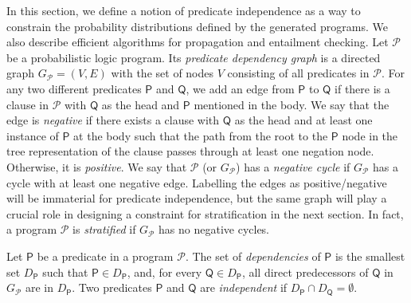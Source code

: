 \documentclass[runningheads]{llncs}
\begin{document}
In this section, we define a notion of predicate independence as a way to
constrain the probability distributions defined by the generated programs. We
also describe efficient algorithms for propagation and entailment checking.
Let $\mathscr{P}$ be a probabilistic logic program. Its \emph{predicate
  dependency graph} is a directed graph $G_{\mathscr{P}} = (V, E)$ with the set
of nodes $V$ consisting of all predicates in $\mathscr{P}$. For any two
different predicates $\mathsf{P}$ and $\mathsf{Q}$, we add an edge from
$\mathsf{P}$ to $\mathsf{Q}$ if there is a clause in $\mathscr{P}$ with
$\mathsf{Q}$ as the head and $\mathsf{P}$ mentioned in the body. We say that the
edge is \emph{negative} if there exists a clause with $\mathsf{Q}$ as the head
and at least one instance of $\mathsf{P}$ at the body such that the path from
the root to the $\mathsf{P}$ node in the tree representation of the clause
passes through at least one negation node. Otherwise, it is \emph{positive}. We
say that $\mathscr{P}$ (or $G_{\mathscr{P}}$) has a \emph{negative cycle} if
$G_{\mathscr{P}}$ has a cycle with at least one negative edge. Labelling the
edges as positive/negative will be immaterial for predicate independence, but
the same graph will play a crucial role in designing a constraint for
stratification in the next section. In fact, a program $\mathscr{P}$ is
\emph{stratified} if $G_{\mathscr{P}}$ has no negative cycles.
\begin{definition}
  Let $\mathsf{P}$ be a predicate in a program $\mathscr{P}$. The set of
  \emph{dependencies} of $\mathsf{P}$ is the smallest set $D_{\mathsf{P}}$ such
  that $\mathsf{P} \in D_{\mathsf{P}}$, and, for every $\mathsf{Q} \in
  D_{\mathsf{P}}$, all direct predecessors of $\mathsf{Q}$ in $G_{\mathscr{P}}$
  are in $D_{\mathsf{P}}$. Two predicates $\mathsf{P}$ and $\mathsf{Q}$ are
  \emph{independent} if $D_{\mathsf{P}} \cap D_{\mathsf{Q}} = \emptyset$.
\end{definition}
\end{document}
